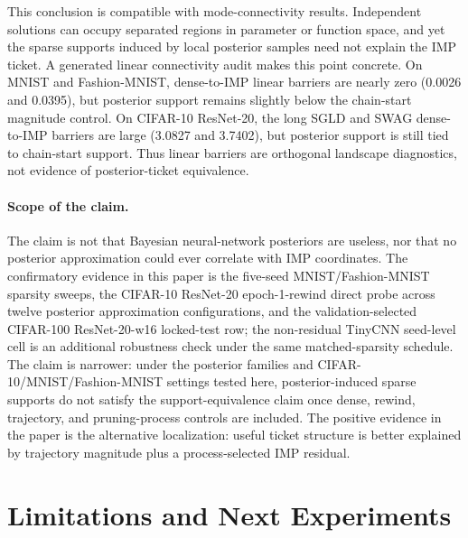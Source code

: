 \documentclass{article}
\begin{document}
This conclusion is compatible with mode-connectivity results. Independent
solutions can occupy separated regions in parameter or function space, and yet
the sparse supports induced by local posterior samples need not explain the IMP
ticket. A generated linear connectivity audit makes this point concrete. On
MNIST and Fashion-MNIST, dense-to-IMP linear barriers are nearly zero (0.0026
and 0.0395), but posterior support remains slightly below the chain-start
magnitude control. On CIFAR-10 ResNet-20, the long SGLD and SWAG dense-to-IMP
barriers are large (3.0827 and 3.7402), but posterior support is still tied to
chain-start support. Thus linear barriers are orthogonal landscape diagnostics,
not evidence of posterior-ticket equivalence.

\paragraph{Scope of the claim.}
The claim is not that Bayesian neural-network posteriors are useless, nor that
no posterior approximation could ever correlate with IMP coordinates. The
confirmatory evidence in this paper is the five-seed MNIST/Fashion-MNIST
sparsity sweeps, the CIFAR-10 ResNet-20 epoch-1-rewind direct probe across
twelve posterior approximation configurations, and the validation-selected
CIFAR-100 ResNet-20-w16 locked-test row; the non-residual TinyCNN
seed-level cell is an additional robustness check under the same
matched-sparsity schedule. The claim
is narrower: under the posterior families and CIFAR-10/MNIST/Fashion-MNIST
settings tested here, posterior-induced sparse supports do not satisfy the
support-equivalence claim once dense, rewind, trajectory, and pruning-process
controls are included. The positive evidence in the paper is the alternative
localization: useful ticket structure is better explained by trajectory
magnitude plus a process-selected IMP residual.

\section{Limitations and Next Experiments}
\label{sec:limitations}
\end{document}
